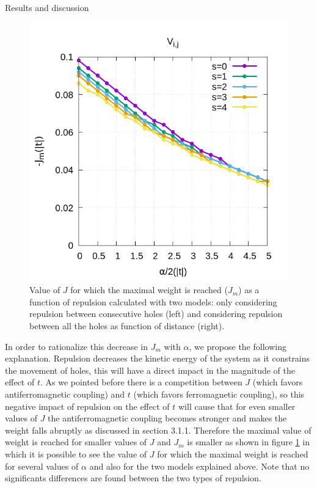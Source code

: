 \documentclass[12pt,twoside]{report}
\begin{document}
\begin{chapter}{Results and discussion}
\begin{figure}[h!]
\begin{minipage}{0.4\textwidth}
			\includegraphics[scale=0.35]{J_vs_xrepvn.png}
		\end{minipage}
		\caption{\label{fig_jv1n} Value of $J$ for which the maximal weight is reached ($J_m$) as a function of repulsion calculated with two models: only considering repulsion between consecutive holes (left) and considering repulsion between all the holes as function of distance (right). }
	\end{figure}

	In order to rationalize this decrease in $J_m$ with $\alpha$, we propose the
	following explanation.  Repulsion decreases the kinetic energy of the system
	as it constrains the movement of holes, this will have a direct impact in
	the magnitude of the effect of $t$. As we pointed before there is a
	competition between $J$ (which favors antiferromagnetic coupling) and $t$
	(which favors ferromagnetic coupling), so this negative impact of repulsion
	on the effect of $t$ will cause that for even smaller values of $J$ the
	antiferromagnetic coupling becomes stronger and makes the weight falls
	abruptly as discussed in section 3.1.1.  Therefore the maximal value of
	weight is reached for smaller values of $J$ and $J_m$ is smaller as shown in
	figure \ref{fig_jv1n} in which it is possible to see the value of $J$ for
	which the maximal weight is reached for several values of $\alpha$ and also
	for the two models explained above. Note that no significants differences
	are found between the two types of repulsion.


\end{chapter}
\end{document}
